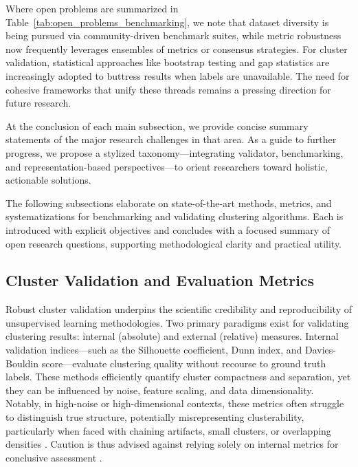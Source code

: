 \documentclass[sigconf]{acmart}
\begin{document}
Where open problems are summarized in Table~\ref{tab:open_problems_benchmarking}, we note that dataset diversity is being pursued via community-driven benchmark suites, while metric robustness now frequently leverages ensembles of metrics or consensus strategies. For cluster validation, statistical approaches like bootstrap testing and gap statistics are increasingly adopted to buttress results when labels are unavailable. The need for cohesive frameworks that unify these threads remains a pressing direction for future research.

At the conclusion of each main subsection, we provide concise summary statements of the major research challenges in that area. As a guide to further progress, we propose a stylized taxonomy---integrating validator, benchmarking, and representation-based perspectives---to orient researchers toward holistic, actionable solutions.

The following subsections elaborate on state-of-the-art methods, metrics, and systematizations for benchmarking and validating clustering algorithms. Each is introduced with explicit objectives and concludes with a focused summary of open research questions, supporting methodological clarity and practical utility.

\subsection{Cluster Validation and Evaluation Metrics}

Robust cluster validation underpins the scientific credibility and reproducibility of unsupervised learning methodologies. Two primary paradigms exist for validating clustering results: internal (absolute) and external (relative) measures. Internal validation indices—such as the Silhouette coefficient, Dunn index, and Davies-Bouldin score—evaluate clustering quality without recourse to ground truth labels. These methods efficiently quantify cluster compactness and separation, yet they can be influenced by noise, feature scaling, and data dimensionality. Notably, in high-noise or high-dimensional contexts, these metrics often struggle to distinguish true structure, potentially misrepresenting clusterability, particularly when faced with chaining artifacts, small clusters, or overlapping densities \cite{ref14,ref16,ref17,ref20,ref21,ref22,ref45,ref46,ref50,ref59,ref60,ref67,ref71,ref72,ref74,ref75,ref78,ref90,ref92,ref93,ref94,ref95,ref96,ref97,ref100,ref113}. Caution is thus advised against relying solely on internal metrics for conclusive assessment \cite{ref14,ref94}.
\end{document}
